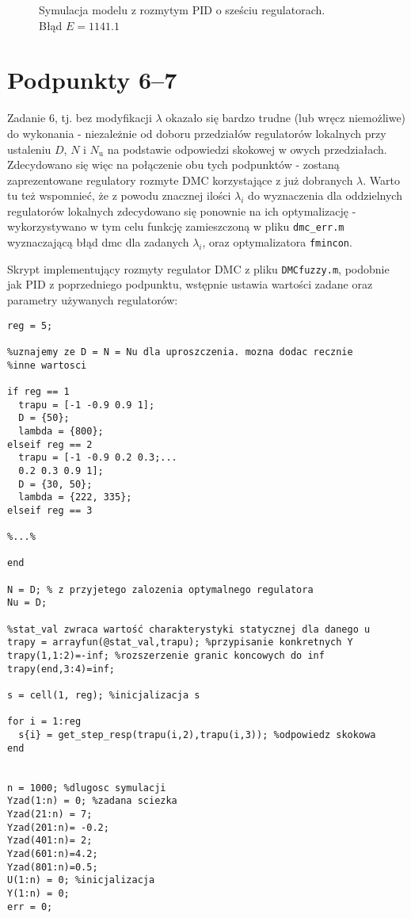 \begin{figure}[ht]
\centering

\caption{Symulacja modelu z rozmytym PID o sześciu regulatorach. \\
Błąd $ E=\num{1141,1} $}
\label{Z5e}
\end{figure}


\chapter{Podpunkty 6--7}
Zadanie 6, tj. bez modyfikacji $ \lambda $ okazało się bardzo trudne (lub wręcz niemożliwe) do wykonania - niezależnie od doboru przedziałów regulatorów lokalnych przy ustaleniu $ D $, $ N $ i $ N_\mathrm{u} $ na podstawie odpowiedzi skokowej w owych przedziałach. Zdecydowano się więc na połączenie obu tych podpunktów - zostaną zaprezentowane regulatory rozmyte DMC korzystające z już dobranych $ \lambda $. Warto tu też wspomnieć, że z powodu znacznej ilości $ \lambda_i $ do wyznaczenia dla oddzielnych regulatorów lokalnych zdecydowano się ponownie na ich optymalizację - wykorzystywano w tym celu funkcję zamieszczoną w pliku \verb|dmc_err.m| wyznaczającą błąd dmc dla zadanych $ \lambda_i $, oraz optymalizatora \verb|fmincon|.

Skrypt implementujący rozmyty regulator DMC z pliku \verb|DMCfuzzy.m|, podobnie jak PID z poprzedniego podpunktu, wstępnie ustawia wartości zadane oraz parametry używanych regulatorów:

\begin{lstlisting}[style=Matlab-editor]
reg = 5;

%uznajemy ze D = N = Nu dla uproszczenia. mozna dodac recznie
%inne wartosci

if reg == 1
  trapu = [-1 -0.9 0.9 1];
  D = {50};
  lambda = {800}; 
elseif reg == 2
  trapu = [-1 -0.9 0.2 0.3;...
  0.2 0.3 0.9 1];
  D = {30, 50};
  lambda = {222, 335};
elseif reg == 3

%...%

end

N = D; % z przyjetego zalozenia optymalnego regulatora
Nu = D;

%stat_val zwraca wartość charakterystyki statycznej dla danego u
trapy = arrayfun(@stat_val,trapu); %przypisanie konkretnych Y
trapy(1,1:2)=-inf; %rozszerzenie granic koncowych do inf
trapy(end,3:4)=inf;

s = cell(1, reg); %inicjalizacja s

for i = 1:reg
  s{i} = get_step_resp(trapu(i,2),trapu(i,3)); %odpowiedz skokowa
end                                              


n = 1000; %dlugosc symulacji
Yzad(1:n) = 0; %zadana sciezka
Yzad(21:n) = 7;
Yzad(201:n)= -0.2;  
Yzad(401:n)= 2; 
Yzad(601:n)=4.2; 
Yzad(801:n)=0.5;
U(1:n) = 0; %inicjalizacja
Y(1:n) = 0;
err = 0;

\end{lstlisting}


